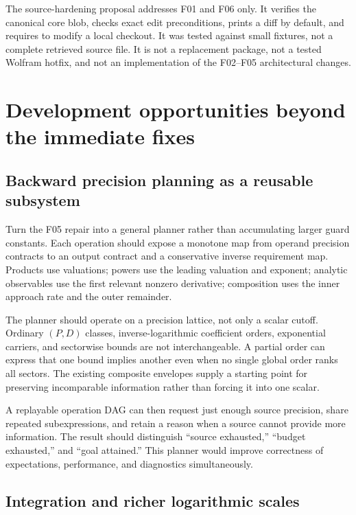 \documentclass[11pt,a4paper]{article}
\newcommand{\code}[1]{\texttt{\detokenize{#1}}}
\begin{document}
The source-hardening proposal addresses F01 and F06 only. It verifies the canonical core blob, checks exact edit preconditions, prints a diff by default, and requires \code{--write} to modify a local checkout. It was tested against small fixtures, not a complete retrieved source file. It is not a replacement package, not a tested Wolfram hotfix, and not an implementation of the F02--F05 architectural changes.

\section{Development opportunities beyond the immediate fixes}\label{sec:future}

\subsection{Backward precision planning as a reusable subsystem}

Turn the F05 repair into a general planner rather than accumulating larger guard constants. Each operation should expose a monotone map from operand precision contracts to an output contract and a conservative inverse requirement map. Products use valuations; powers use the leading valuation and exponent; analytic observables use the first relevant nonzero derivative; composition uses the inner approach rate and the outer remainder.

The planner should operate on a precision lattice, not only a scalar cutoff. Ordinary $(P,D)$ classes, inverse-logarithmic coefficient orders, exponential carriers, and sectorwise bounds are not interchangeable. A partial order can express that one bound implies another even when no single global order ranks all sectors. The existing composite envelopes supply a starting point for preserving incomparable information rather than forcing it into one scalar.\cite{ops,native,arithmetic}

A replayable operation DAG can then request just enough source precision, share repeated subexpressions, and retain a reason when a source cannot provide more information. The result should distinguish ``source exhausted,'' ``budget exhausted,'' and ``goal attained.'' This planner would improve correctness of expectations, performance, and diagnostics simultaneously.

\subsection{Integration and richer logarithmic scales}
\end{document}
